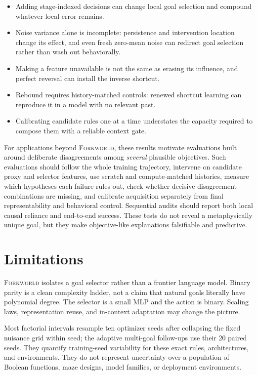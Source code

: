 \documentclass[11pt,a4paper]{article}
\newcommand{\Forkworld}{\textsc{Forkworld}}
\begin{document}
\begin{itemize}[leftmargin=*,itemsep=0.35em]
  \item Adding stage-indexed decisions can change local goal selection and compound whatever local error remains.
  \item Noise variance alone is incomplete: persistence and intervention location change its effect, and even fresh zero-mean noise can redirect goal selection rather than wash out behaviorally.
  \item Making a feature unavailable is not the same as erasing its influence, and perfect reversal can install the inverse shortcut.
  \item Rebound requires history-matched controls: renewed shortcut learning can reproduce it in a model with no relevant past.
  \item Calibrating candidate rules one at a time understates the capacity required to compose them with a reliable context gate.
\end{itemize}

For applications beyond \Forkworld{}, these results motivate evaluations built around deliberate disagreements among \emph{several} plausible objectives. Such evaluations should follow the whole training trajectory, intervene on candidate proxy and selector features, use scratch and compute-matched histories, measure which hypotheses each failure rules out, check whether decisive disagreement combinations are missing, and calibrate acquisition separately from final representability and behavioral control. Sequential audits should report both local causal reliance and end-to-end success. These tests do not reveal a metaphysically unique goal, but they make objective-like explanations falsifiable and predictive.

\section*{Limitations}

\Forkworld{} isolates a goal selector rather than a frontier language model. Binary parity is a clean complexity ladder, not a claim that natural goals literally have polynomial degree. The selector is a small MLP and the action is binary. Scaling laws, representation reuse, and in-context adaptation may change the picture.

Most factorial intervals resample ten optimizer seeds after collapsing the fixed nuisance grid within seed; the adaptive multi-goal follow-ups use their 20 paired seeds. They quantify training-seed variability for these exact rules, architectures, and environments. They do not represent uncertainty over a population of Boolean functions, maze designs, model families, or deployment environments.
\end{document}
